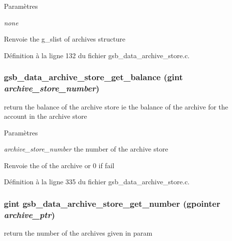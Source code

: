 \begin{DoxyParams}{Paramètres}
\item[{\em none}]\end{DoxyParams}
\begin{DoxyReturn}{Renvoie}
the g\_\-slist of archives structure 
\end{DoxyReturn}


Définition à la ligne 132 du fichier gsb\_\-data\_\-archive\_\-store.c.

\subsubsection[{gsb\_\-data\_\-archive\_\-store\_\-get\_\-balance}]{ gsb\_\-data\_\-archive\_\-store\_\-get\_\-balance (gint {\em archive\_\-store\_\-number})}\label{gsb__data__archive__store_8c_abd95449e6aba688e9b5f6536f2cea027}
return the balance of the archive store ie the balance of the archive for the account in the archive store


\begin{DoxyParams}{Paramètres}
\item[{\em archive\_\-store\_\-number}]the number of the archive store\end{DoxyParams}
\begin{DoxyReturn}{Renvoie}
the of the archive or 0 if fail 
\end{DoxyReturn}


Définition à la ligne 335 du fichier gsb\_\-data\_\-archive\_\-store.c.

\subsubsection[{gsb\_\-data\_\-archive\_\-store\_\-get\_\-number}]{\setlength{\rightskip}{0pt plus 5cm}gint gsb\_\-data\_\-archive\_\-store\_\-get\_\-number (gpointer {\em archive\_\-ptr})}\label{gsb__data__archive__store_8c_a33d414762707f17772146fca8dc8db36}
return the number of the archives given in param


